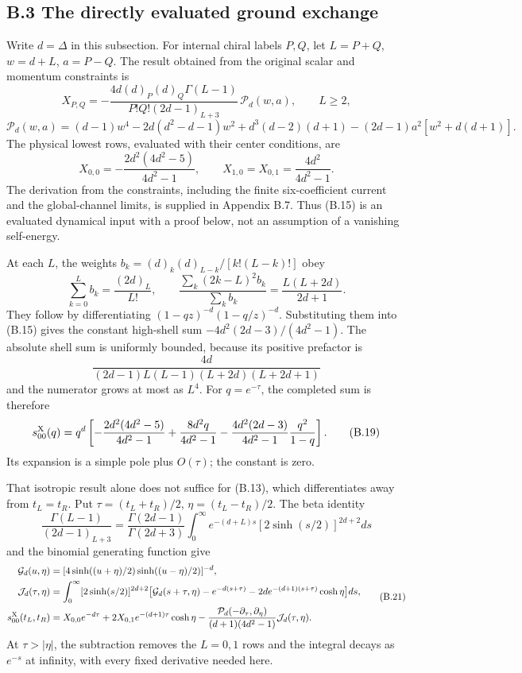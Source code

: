 \hypertarget{b.3-the-directly-evaluated-ground-exchange}{%
\subsection{B.3 The directly evaluated ground exchange}\label{b.3-the-directly-evaluated-ground-exchange}}

Write \(d=\Delta\) in this subsection. For internal chiral labels \(P,Q\), let \(L=P+Q\), \(w=d+L\), \(a=P-Q\). The result obtained from the original scalar and momentum constraints is \[
X_{P,Q}
=-\frac{4d(d)_P(d)_Q\Gamma(L-1)}
{P!Q!(2d-1)_{L+3}}\,
\mathcal P_d(w,a),\qquad L\ge2,
\tag{B.15}
\] \[
\mathcal P_d(w,a)
=(d-1)w^4-2d(d^2-d-1)w^2+d^3(d-2)(d+1)
-(2d-1)a^2[w^2+d(d+1)].
\tag{B.16}
\] The physical lowest rows, evaluated with their center conditions, are \[
X_{0,0}=-\frac{2d^2(4d^2-5)}{4d^2-1},
\qquad
X_{1,0}=X_{0,1}=\frac{4d^2}{4d^2-1}.
\tag{B.17}
\] The derivation from the constraints, including the finite six-coefficient current and the global-channel limits, is supplied in Appendix B.7. Thus (B.15) is an evaluated dynamical input with a proof below, not an assumption of a vanishing self-energy.

At each \(L\), the weights \(b_k=(d)_k(d)_{L-k}/[k!(L-k)!]\) obey \[
\sum_{k=0}^Lb_k=\frac{(2d)_L}{L!},\qquad
\frac{\sum_k(2k-L)^2b_k}{\sum_kb_k}
=\frac{L(L+2d)}{2d+1}.
\tag{B.18}
\] They follow by differentiating \((1-qz)^{-d}(1-q/z)^{-d}\). Substituting them into (B.15) gives the constant high-shell sum \(-4d^2(2d-3)/(4d^2-1)\). The absolute shell sum is uniformly bounded, because its positive prefactor is \[
\frac{4d}{(2d-1)L(L-1)(L+2d)(L+2d+1)}
\] and the numerator grows at most as \(L^4\). For \(q=e^{-\tau}\), the completed sum is therefore \[
s^{\rm X}_{00}(q)=q^d\left[
-\frac{2d^2(4d^2-5)}{4d^2-1}
+\frac{8d^2q}{4d^2-1}
-\frac{4d^2(2d-3)}{4d^2-1}\frac{q^2}{1-q}\right].
\tag{B.19}
\] Its expansion is a simple pole plus \(O(\tau)\); the constant is zero.

That isotropic result alone does not suffice for (B.13), which differentiates away from \(t_L=t_R\). Put \(\tau=(t_L+t_R)/2\), \(\eta=(t_L-t_R)/2\). The beta identity \[
\frac{\Gamma(L-1)}{(2d-1)_{L+3}}
=\frac{\Gamma(2d-1)}{\Gamma(2d+3)}
\int_0^\infty e^{-(d+L)s}[2\sinh(s/2)]^{2d+2}ds
\tag{B.20}
\] and the binomial generating function give \[
\begin{aligned}
\mathcal G_d(u,\eta)
&=[4\sinh((u+\eta)/2)\sinh((u-\eta)/2)]^{-d},\\
\mathcal J_d(\tau,\eta)
&=\int_0^\infty[2\sinh(s/2)]^{2d+2}
\bigl[\mathcal G_d(s+\tau,\eta)-e^{-d(s+\tau)}
-2de^{-(d+1)(s+\tau)}\cosh\eta\bigr]ds,\\
s_{00}^{\rm X}(t_L,t_R)
&=X_{0,0}e^{-d\tau}
+2X_{0,1}e^{-(d+1)\tau}\cosh\eta
-\frac{\mathcal P_d(-\partial_\tau,\partial_\eta)}
{(d+1)(4d^2-1)}\mathcal J_d(\tau,\eta).
\end{aligned}
\tag{B.21}
\] At \(\tau>|\eta|\), the subtraction removes the \(L=0,1\) rows and the integral decays as \(e^{-s}\) at infinity, with every fixed derivative needed here.

